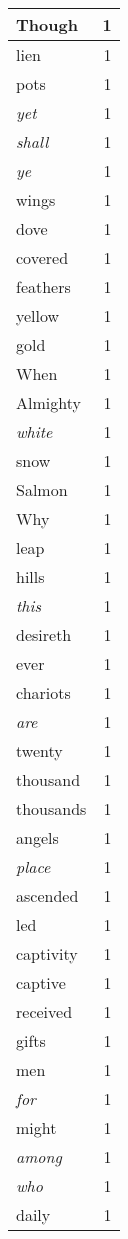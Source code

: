 \begin{center}
\begin{longtable}{l|r}
Though & 1 \\ \hline
lien & 1 \\ \hline
pots & 1 \\ \hline
\emph{yet} & 1 \\ \hline
\emph{shall} & 1 \\ \hline
\emph{ye} & 1 \\ \hline
wings & 1 \\ \hline
dove & 1 \\ \hline
covered & 1 \\ \hline
feathers & 1 \\ \hline
yellow & 1 \\ \hline
gold & 1 \\ \hline
When & 1 \\ \hline
Almighty & 1 \\ \hline
\emph{white} & 1 \\ \hline
snow & 1 \\ \hline
Salmon & 1 \\ \hline
Why & 1 \\ \hline
leap & 1 \\ \hline
hills & 1 \\ \hline
\emph{this} & 1 \\ \hline
desireth & 1 \\ \hline
ever & 1 \\ \hline
chariots & 1 \\ \hline
\emph{are} & 1 \\ \hline
twenty & 1 \\ \hline
thousand & 1 \\ \hline
thousands & 1 \\ \hline
angels & 1 \\ \hline
\emph{place} & 1 \\ \hline
ascended & 1 \\ \hline
led & 1 \\ \hline
captivity & 1 \\ \hline
captive & 1 \\ \hline
received & 1 \\ \hline
gifts & 1 \\ \hline
men & 1 \\ \hline
\emph{for} & 1 \\ \hline
might & 1 \\ \hline
\emph{among} & 1 \\ \hline
\emph{who} & 1 \\ \hline
daily & 1 \\ \hline

\end{longtable}
\end{center}
